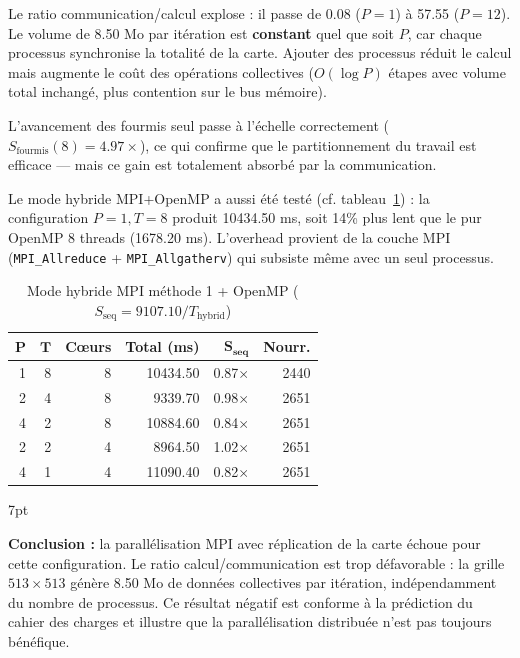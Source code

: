 \documentclass[11pt,a4paper]{article}
\newenvironment{formal}{%
  \def\FrameCommand{%
    \hspace{1pt}%
    {\color{enstaBleuFonce}\vrule width 2pt}%
    {\color{formalshade}\vrule width 4pt}%
    \colorbox{formalshade}%
  }%
  \MakeFramed{\advance\hsize-\width\FrameRestore}%
  \noindent\hspace{-4.55pt}%
  \begin{adjustwidth}{}{7pt}%
  \vspace{2pt}\vspace{2pt}%
}
{%
  \vspace{6pt}\end{adjustwidth}\endMakeFramed%
}
\begin{document}
Le ratio communication/calcul explose : il passe de 0.08 ($P=1$) à 57.55 ($P=12$). Le volume de 8.50 Mo par itération est \textbf{constant} quel que soit $P$, car chaque processus synchronise la totalité de la carte. Ajouter des processus réduit le calcul mais augmente le coût des opérations collectives ($O(\log P)$ étapes avec volume total inchangé, plus contention sur le bus mémoire).

L'avancement des fourmis seul passe à l'échelle correctement ($S_\text{fourmis}(8) = 4.97\times$), ce qui confirme que le partitionnement du travail est efficace --- mais ce gain est totalement absorbé par la communication.

Le mode hybride MPI+OpenMP a aussi été testé (cf. tableau~\ref{tab:mpi1_hybrid}) : la configuration $P=1, T=8$ produit 10434.50 ms, soit 14\% plus lent que le pur OpenMP 8 threads (1678.20 ms). L'overhead provient de la couche MPI (\texttt{MPI\_Allreduce} + \texttt{MPI\_Allgatherv}) qui subsiste même avec un seul processus.

\begin{table}[H]
\centering
\begin{tabular}{rrrrrr}
\toprule
$\boldsymbol{P}$ & $\boldsymbol{T}$ & \textbf{Cœurs} & \textbf{Total (ms)} & $\boldsymbol{S_\text{seq}}$ & \textbf{Nourr.} \\
\midrule
1 & 8  & 8  & 10434.50  & 0.87$\times$ & 2440 \\
2 & 4  & 8  & 9339.70   & 0.98$\times$ & 2651 \\
4 & 2  & 8  & 10884.60  & 0.84$\times$ & 2651 \\
2 & 2  & 4  & 8964.50   & 1.02$\times$ & 2651 \\
4 & 1  & 4  & 11090.40  & 0.82$\times$ & 2651 \\
\bottomrule
\end{tabular}
\caption{Mode hybride MPI méthode 1 + OpenMP ($S_\text{seq} = 9107.10 / T_\text{hybrid}$)}
\label{tab:mpi1_hybrid}
\end{table}

\begin{formal}
\textbf{Conclusion :} la parallélisation MPI avec réplication de la carte échoue pour cette configuration. Le ratio calcul/communication est trop défavorable : la grille $513 \times 513$ génère 8.50 Mo de données collectives par itération, indépendamment du nombre de processus. Ce résultat négatif est conforme à la prédiction du cahier des charges et illustre que la parallélisation distribuée n'est pas toujours bénéfique.
\end{formal}
\end{document}
